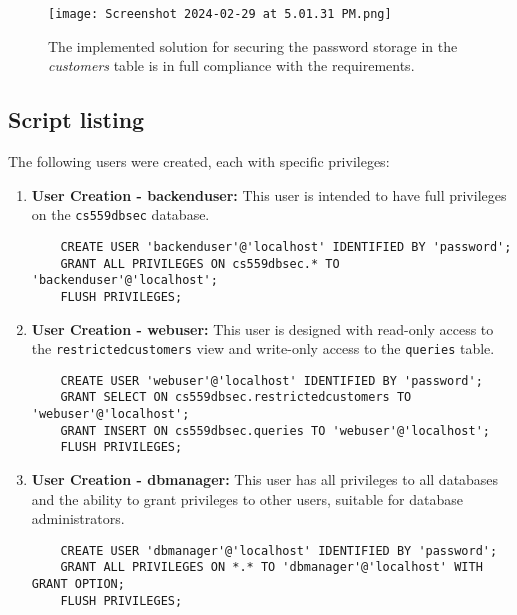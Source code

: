 \documentclass{article}
\begin{document}
\begin{figure}[H]
    \centering
    \texttt{[image: Screenshot 2024-02-29 at 5.01.31 PM.png]}
    \caption{The implemented solution for securing the password storage in the \textit{customers} table is in full compliance with the requirements.}
\end{figure}

\subsection*{Script listing}



The following users were created, each with specific privileges:

\begin{enumerate}
    \item \textbf{User Creation - backenduser:}
    This user is intended to have full privileges on the \texttt{cs559dbsec} database.
    \begin{verbatim}
    CREATE USER 'backenduser'@'localhost' IDENTIFIED BY 'password';
    GRANT ALL PRIVILEGES ON cs559dbsec.* TO 'backenduser'@'localhost';
    FLUSH PRIVILEGES;
    \end{verbatim}

    \item \textbf{User Creation - webuser:}
    This user is designed with read-only access to the \texttt{restrictedcustomers} view and write-only access to the \texttt{queries} table.
    \begin{verbatim}
    CREATE USER 'webuser'@'localhost' IDENTIFIED BY 'password';
    GRANT SELECT ON cs559dbsec.restrictedcustomers TO 'webuser'@'localhost';
    GRANT INSERT ON cs559dbsec.queries TO 'webuser'@'localhost';
    FLUSH PRIVILEGES;
    \end{verbatim}

    \item \textbf{User Creation - dbmanager:}
    This user has all privileges to all databases and the ability to grant privileges to other users, suitable for database administrators.
    \begin{verbatim}
    CREATE USER 'dbmanager'@'localhost' IDENTIFIED BY 'password';
    GRANT ALL PRIVILEGES ON *.* TO 'dbmanager'@'localhost' WITH GRANT OPTION;
    FLUSH PRIVILEGES;
    \end{verbatim}
\end{enumerate}
\end{document}
